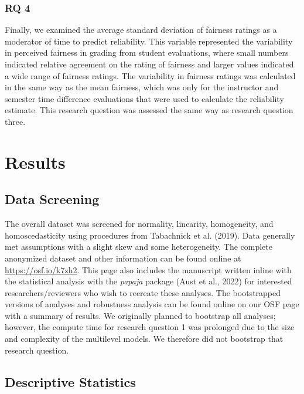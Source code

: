\documentclass[
  man]{apa7}
\begin{document}
\hypertarget{rq-4}{%
\subsubsection{RQ 4}\label{rq-4}}

Finally, we examined the average standard deviation of fairness ratings
as a moderator of time to predict reliability. This variable represented
the variability in perceived fairness in grading from student
evaluations, where small numbers indicated relative agreement on the
rating of fairness and larger values indicated a wide range of fairness
ratings. The variability in fairness ratings was calculated in the same
way as the mean fairness, which was only for the instructor and semester
time difference evaluations that were used to calculate the reliability
estimate. This research question was assessed the same way as research
question three.

\hypertarget{results}{%
\section{Results}\label{results}}

\hypertarget{data-screening}{%
\subsection{Data Screening}\label{data-screening}}

The overall dataset was screened for normality, linearity, homogeneity,
and homoscedasticity using procedures from Tabachnick et al. (2019). Data
generally met assumptions with a slight skew and some heterogeneity. The
complete anonymized dataset and other information can be found online at
\url{https://osf.io/k7zh2}. This page also includes the manuscript written
inline with the statistical analysis with the \emph{papaja} package
(Aust et al., 2022) for interested researchers/reviewers who wish to recreate
these analyses. The bootstrapped versions of analyses and robustness
analysis can be found online on our OSF page with a summary of results.
We originally planned to bootstrap all analyses; however, the compute
time for research question 1 was prolonged due to the size and
complexity of the multilevel models. We therefore did not bootstrap that
research question.

\hypertarget{descriptive-statistics}{%
\subsection{Descriptive Statistics}\label{descriptive-statistics}}
\end{document}
